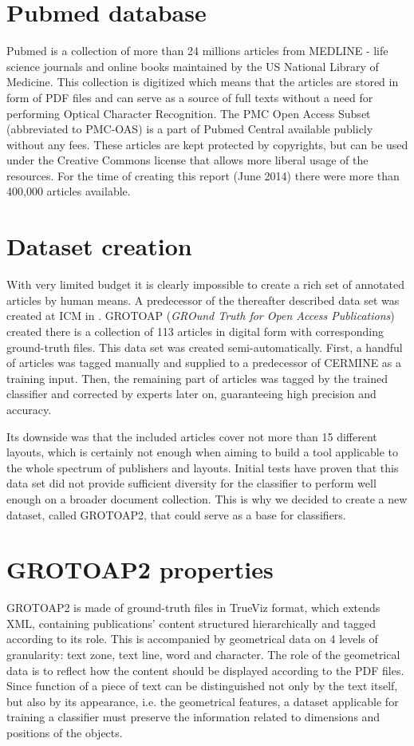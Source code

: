\section{Pubmed database}
Pubmed \cite{Pubmed} is a collection of more than 24 millions articles from MEDLINE - life science journals and online books maintained by the US National Library of Medicine. This collection is digitized which means that the articles are stored in form of PDF files and can serve as a source of full texts without a need for performing Optical Character Recognition. 
The PMC Open Access Subset (abbreviated to PMC-OAS) is a part of Pubmed Central available publicly without any fees. These articles are kept protected by copyrights, but can be used under the Creative Commons license that allows more liberal usage of the resources. For the time of creating this report (June 2014) there were more than 400,000 articles available.
\section{Dataset creation}
With very limited budget it is clearly impossible to create a rich set of annotated articles by human means. A predecessor of the thereafter described data set was created at ICM in \cite{Tkaczyk2012}. GROTOAP (\textit{GROund Truth for Open Access Publications}) created there is a collection of 113 articles in digital form with corresponding ground-truth files. This data set was created semi-automatically. First, a handful of articles was tagged manually and supplied to a predecessor of CERMINE as a training input. Then, the remaining part of articles was tagged by the trained classifier and corrected by experts later on, guaranteeing high precision and accuracy.

Its downside was that the included articles cover not more than 15 different layouts, which is certainly not enough when aiming to build a tool applicable to the whole spectrum of publishers and layouts. Initial tests have proven that this data set did not provide sufficient diversity for the classifier to perform well enough on a broader document collection. This is why we decided to create a new dataset, called GROTOAP2, that could serve as a base for classifiers.

\section{GROTOAP2 properties}
GROTOAP2 is made of ground-truth files in TrueViz format, which extends XML, containing publications' content structured hierarchically and tagged according to its role. This is accompanied by geometrical data on 4 levels of granularity: text zone, text line, word and character. The role of the geometrical data is to reflect how the content should be displayed according to the PDF files. Since function of a piece of text can be distinguished not only by the text itself, but also by its appearance, i.e. the geometrical features, a dataset applicable for training a classifier must preserve the information related to dimensions and positions of the objects.

